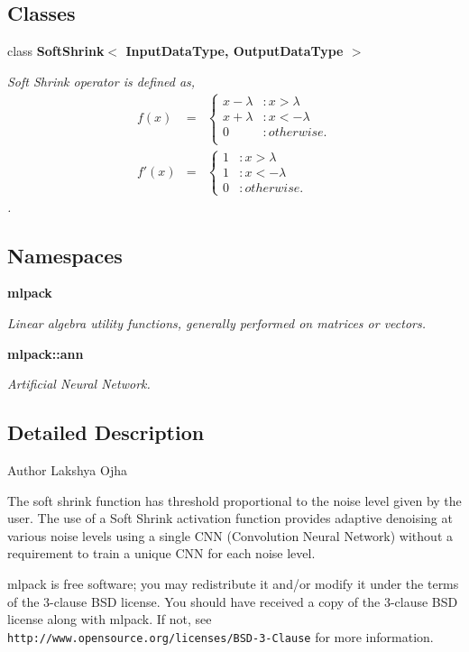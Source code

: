 \subsection*{Classes}
\begin{DoxyCompactItemize}
\item 
class \textbf{ Soft\+Shrink$<$ Input\+Data\+Type, Output\+Data\+Type $>$}
\begin{DoxyCompactList}\small\item\em Soft Shrink operator is defined as, \begin{eqnarray*} f(x) &=& \begin{cases} x - \lambda & : x > \lambda \\ x + \lambda & : x < -\lambda \\ 0 & : otherwise. \\ \end{cases} \\ f'(x) &=& \begin{cases} 1 & : x > \lambda \\ 1 & : x < -\lambda \\ 0 & : otherwise. \end{cases} \end{eqnarray*}. \end{DoxyCompactList}\end{DoxyCompactItemize}
\subsection*{Namespaces}
\begin{DoxyCompactItemize}
\item 
 \textbf{ mlpack}
\begin{DoxyCompactList}\small\item\em Linear algebra utility functions, generally performed on matrices or vectors. \end{DoxyCompactList}\item 
 \textbf{ mlpack\+::ann}
\begin{DoxyCompactList}\small\item\em Artificial Neural Network. \end{DoxyCompactList}\end{DoxyCompactItemize}


\subsection{Detailed Description}
\begin{DoxyAuthor}{Author}
Lakshya Ojha
\end{DoxyAuthor}
The soft shrink function has threshold proportional to the noise level given by the user. The use of a Soft Shrink activation function provides adaptive denoising at various noise levels using a single C\+NN (Convolution Neural Network) without a requirement to train a unique C\+NN for each noise level.

mlpack is free software; you may redistribute it and/or modify it under the terms of the 3-\/clause B\+SD license. You should have received a copy of the 3-\/clause B\+SD license along with mlpack. If not, see {\tt http\+://www.\+opensource.\+org/licenses/\+B\+S\+D-\/3-\/\+Clause} for more information. 